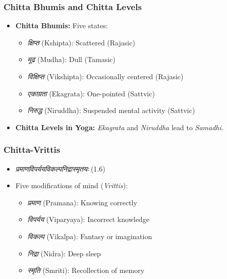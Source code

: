 \begin{frame}[fragile]\frametitle{Chitta Bhumis and Chitta Levels}

    \begin{itemize}
        \item \textbf{Chitta Bhumis:} Five states:
        \begin{itemize}
            \item \textit{क्षिप्त} (Kshipta): Scattered (Rajasic)
            \item \textit{मूढ} (Mudha): Dull (Tamasic)
            \item \textit{विक्षिप्त} (Vikshipta): Occasionally centered (Rajasic)
            \item \textit{एकाग्रता} (Ekagrata): One-pointed (Sattvic)
            \item \textit{निरुद्ध} (Niruddha): Suspended mental activity (Sattvic)
        \end{itemize}
        \item \textbf{Chitta Levels in Yoga:} \textit{Ekagrata} and \textit{Niruddha} lead to \textit{Samadhi}.
    \end{itemize}

\end{frame}


\begin{frame}[fragile]\frametitle{Chitta-Vrittis}
    \begin{itemize}
        \item \textit{प्रमाणविपर्ययविकल्पनिद्रास्मृतयः} (1.6)
        \item Five modifications of mind (\textit{Vrittis}):
        \begin{itemize}
            \item \textit{प्रमाण} (Pramana): Knowing correctly
            \item \textit{विपर्यय} (Viparyaya): Incorrect knowledge
            \item \textit{विकल्प} (Vikalpa): Fantasy or imagination
            \item \textit{निद्रा} (Nidra): Deep sleep
            \item \textit{स्मृति} (Smriti): Recollection of memory
        \end{itemize}
    \end{itemize}
\end{frame}


